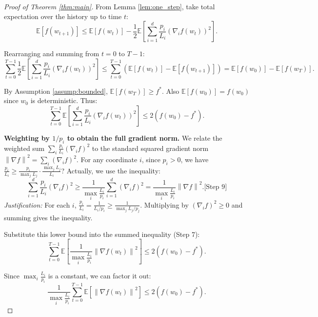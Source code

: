 \documentclass{article}
\newcommand{\E}{\mathbb{E}}
\newcommand{\norm}[1]{\left\|#1\right\|}
\newcommand{\step}[1]{\text{[Step #1]}}
\begin{document}
\begin{proof}[Proof of Theorem \ref{thm:main}]

\step{5} From Lemma \ref{lem:one_step}, take total expectation over the history up to time $t$:
\begin{equation}
\E\left[ f(w_{t+1}) \right] \le \E\left[ f(w_t) \right] - \frac{1}{2} \E\left[ \sum_{i=1}^d \frac{p_i}{L_i} \left( \nabla_i f(w_t) \right)^2 \right].
\end{equation}

\step{6} Rearranging and summing from $t=0$ to $T-1$:
\begin{equation}
\sum_{t=0}^{T-1} \frac{1}{2} \E\left[ \sum_{i=1}^d \frac{p_i}{L_i} \left( \nabla_i f(w_t) \right)^2 \right]
\le \sum_{t=0}^{T-1} \left( \E[f(w_t)] - \E[f(w_{t+1})] \right)
= \E[f(w_0)] - \E[f(w_T)].
\end{equation}

\step{7} By Assumption \ref{assump:bounded}, $\E[f(w_T)] \ge f^*$. Also $\E[f(w_0)] = f(w_0)$ since $w_0$ is deterministic. Thus:
\begin{equation}
\sum_{t=0}^{T-1} \E\left[ \sum_{i=1}^d \frac{p_i}{L_i} \left( \nabla_i f(w_t) \right)^2 \right]
\le 2 \left( f(w_0) - f^* \right).
\end{equation}

\step{8} \textbf{Weighting by $1/p_i$ to obtain the full gradient norm.}
We relate the weighted sum $\sum_i \frac{p_i}{L_i} (\nabla_i f)^2$ to the standard squared gradient norm $\norm{\nabla f}^2 = \sum_i (\nabla_i f)^2$.
For any coordinate $i$, since $p_i > 0$, we have $\frac{p_i}{L_i} \ge \frac{p_i}{\max_j L_j} \cdot \frac{\max_j L_j}{L_i}$? Actually, we use the inequality:
\begin{equation}
\sum_{i=1}^d \frac{p_i}{L_i} (\nabla_i f)^2
\ge \frac{1}{\max_i \frac{L_i}{p_i}} \sum_{i=1}^d (\nabla_i f)^2
= \frac{1}{\max_i \frac{L_i}{p_i}} \norm{\nabla f}^2. \step{9}
\end{equation}
\step{9} \textit{Justification:} For each $i$, $\frac{p_i}{L_i} = \frac{1}{L_i/p_i} \ge \frac{1}{\max_j L_j/p_j}$. Multiplying by $(\nabla_i f)^2 \ge 0$ and summing gives the inequality.

\step{10} Substitute this lower bound into the summed inequality (Step 7):
\begin{equation}
\sum_{t=0}^{T-1} \E\left[ \frac{1}{\max_i \frac{L_i}{p_i}} \norm{\nabla f(w_t)}^2 \right]
\le 2 \left( f(w_0) - f^* \right).
\end{equation}

\step{11} Since $\max_i \frac{L_i}{p_i}$ is a constant, we can factor it out:
\begin{equation}
\frac{1}{\max_i \frac{L_i}{p_i}} \sum_{t=0}^{T-1} \E\left[ \norm{\nabla f(w_t)}^2 \right]
\le 2 \left( f(w_0) - f^* \right).
\end{equation}


\end{proof}
\end{document}

